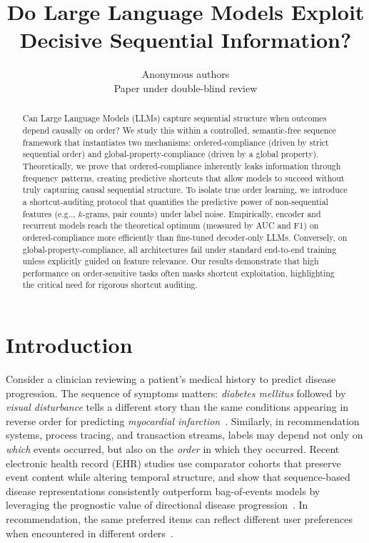 \documentclass{article} %
\title{Do Large Language Models Exploit Decisive Sequential Information?}
\author{Anonymous authors \\
Paper under double-blind review}
\makeatletter
\def\@onedot{\ifx\@let@token.\else.\null\fi\xspace}
\def\onedot{\futurelet\@let@token\@onedot}
\def\eg{e.g\onedot} \def\Eg{E.g\onedot}
\theoremstyle{plain}
\theoremstyle{definition}
\theoremstyle{remark}
\makeatother
\begin{document}
\maketitle

\begin{abstract}
Can Large Language Models (LLMs) capture sequential structure when outcomes depend causally on order? We study this within a controlled, semantic-free sequence framework that instantiates two mechanisms: ordered-compliance (driven by strict sequential order) and global-property-compliance (driven by a global property). Theoretically, we prove that ordered-compliance inherently leaks information through frequency patterns, creating predictive shortcuts that allow models to succeed without truly capturing causal sequential structure. To isolate true order learning, we introduce a shortcut-auditing protocol that quantifies the predictive power of non-sequential features (\eg, $k$-grams, pair counts) under label noise. Empirically, encoder and recurrent models reach the theoretical optimum (measured by AUC and F1) on ordered-compliance more efficiently than fine-tuned decoder-only LLMs. Conversely, on global-property-compliance, all architectures fail under standard end-to-end training unless explicitly guided on feature relevance. Our results demonstrate that high performance on order-sensitive tasks often masks shortcut exploitation, highlighting the critical need for rigorous shortcut auditing.
\end{abstract}

\section{Introduction}
\label{sec:introduction}

Consider a clinician reviewing a patient's medical history to predict disease progression. The sequence of symptoms matters: \textit{diabetes mellitus} followed by \textit{visual disturbance} tells a different story than the same conditions appearing in reverse order for predicting \textit{myocardial infarction}~\citep{edelman2026order_specific_ehr}. Similarly, in recommendation systems, process tracing, and transaction streams, labels may depend not only on \emph{which} events occurred, but also on the \emph{order} in which they occurred. Recent electronic health record (EHR) studies use comparator cohorts that preserve event content while altering temporal structure, and show that sequence-based disease representations consistently outperform bag-of-events models by leveraging the prognostic value of directional disease progression~\citep{edelman2026order_specific_ehr,beaney2024coded_disease_representations,placido2023pancreatic_trajectories,pollington2026trajectory_review}. In recommendation, the same preferred items can reflect different user preferences when encountered in different orders~\citep{kimLostSequenceLarge2025b}.
\end{document}

